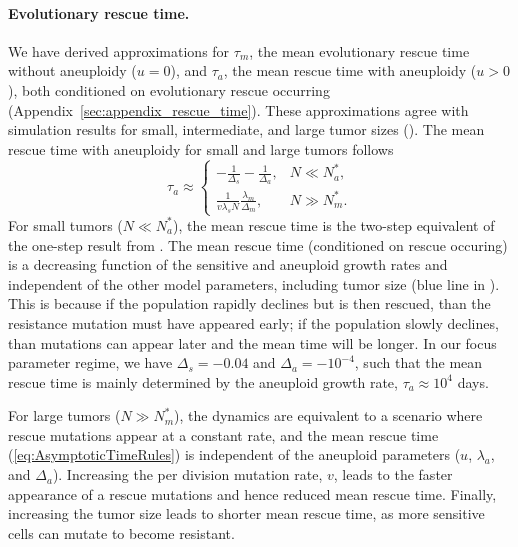 \documentclass[12pt]{extarticle}
\begin{document}
\paragraph{Evolutionary rescue time.}
We have derived approximations for $\tau_m$, the mean evolutionary rescue time without aneuploidy ($u=0$), and $\tau_a$, the mean rescue time with aneuploidy ($u>0$), both conditioned on evolutionary rescue occurring (Appendix~\ref{sec:appendix_rescue_time}).
These approximations agree with simulation results for small, intermediate, and large tumor sizes ().
The mean rescue time with aneuploidy for small and large tumors follows
\begin{equation}  \label{eq:AsymptoticTimeRules}
\tau_a \approx \begin{cases}
    -\frac{1}{\Delta_s}-\frac{1}{\Delta_a} ,&
 N \ll N_a^* ,\\ 
  \frac{1}{v\lambda_s N}   \frac{\lambda_m}{\Delta_m} ,& 
  N \gg N_m^* .
  \end{cases}
\end{equation} 
For small tumors ($ N \ll N_a^*$), the mean rescue time is the two-step equivalent of the one-step result from \citet[expectation of eq.~18]{orr2014population}. The mean rescue time (conditioned on rescue occuring) is a decreasing function of the sensitive and aneuploid growth rates and independent of the other model parameters, including tumor size (blue line in ). This is because if the population rapidly declines but is then rescued, than the resistance mutation must have appeared early; if the population slowly declines, than mutations can appear later and the mean time will be longer. In our focus parameter regime, we have $\Delta_s=-0.04$ and $\Delta_a=-10^{-4}$, such that the mean rescue time is mainly determined by the aneuploid growth rate, $\tau_a \approx 10^4$ days. %

For large tumors ($N \gg N_m^*$), the dynamics are equivalent to a scenario where rescue mutations appear at a constant rate, and the mean rescue time (\cref{eq:AsymptoticTimeRules}) is independent of the aneuploid parameters ($u$, $\lambda_a$, and $\Delta_a$). Increasing the per division mutation rate, $v$, leads to the faster appearance of a rescue mutations and hence reduced mean rescue time. Finally, increasing the tumor size leads to shorter mean rescue time, as more sensitive cells can mutate to become resistant. %
\end{document}

